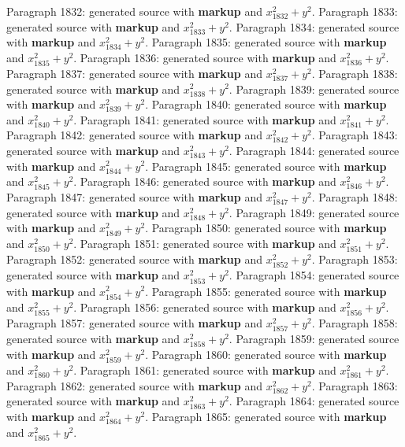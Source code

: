 \documentclass{article}
\begin{document}
Paragraph 1832: generated source with \textbf{markup} and $x_{1832}^2 + y^2$.
Paragraph 1833: generated source with \textbf{markup} and $x_{1833}^2 + y^2$.
Paragraph 1834: generated source with \textbf{markup} and $x_{1834}^2 + y^2$.
Paragraph 1835: generated source with \textbf{markup} and $x_{1835}^2 + y^2$.
Paragraph 1836: generated source with \textbf{markup} and $x_{1836}^2 + y^2$.
Paragraph 1837: generated source with \textbf{markup} and $x_{1837}^2 + y^2$.
Paragraph 1838: generated source with \textbf{markup} and $x_{1838}^2 + y^2$.
Paragraph 1839: generated source with \textbf{markup} and $x_{1839}^2 + y^2$.
Paragraph 1840: generated source with \textbf{markup} and $x_{1840}^2 + y^2$.
Paragraph 1841: generated source with \textbf{markup} and $x_{1841}^2 + y^2$.
Paragraph 1842: generated source with \textbf{markup} and $x_{1842}^2 + y^2$.
Paragraph 1843: generated source with \textbf{markup} and $x_{1843}^2 + y^2$.
Paragraph 1844: generated source with \textbf{markup} and $x_{1844}^2 + y^2$.
Paragraph 1845: generated source with \textbf{markup} and $x_{1845}^2 + y^2$.
Paragraph 1846: generated source with \textbf{markup} and $x_{1846}^2 + y^2$.
Paragraph 1847: generated source with \textbf{markup} and $x_{1847}^2 + y^2$.
Paragraph 1848: generated source with \textbf{markup} and $x_{1848}^2 + y^2$.
Paragraph 1849: generated source with \textbf{markup} and $x_{1849}^2 + y^2$.
Paragraph 1850: generated source with \textbf{markup} and $x_{1850}^2 + y^2$.
Paragraph 1851: generated source with \textbf{markup} and $x_{1851}^2 + y^2$.
Paragraph 1852: generated source with \textbf{markup} and $x_{1852}^2 + y^2$.
Paragraph 1853: generated source with \textbf{markup} and $x_{1853}^2 + y^2$.
Paragraph 1854: generated source with \textbf{markup} and $x_{1854}^2 + y^2$.
Paragraph 1855: generated source with \textbf{markup} and $x_{1855}^2 + y^2$.
Paragraph 1856: generated source with \textbf{markup} and $x_{1856}^2 + y^2$.
Paragraph 1857: generated source with \textbf{markup} and $x_{1857}^2 + y^2$.
Paragraph 1858: generated source with \textbf{markup} and $x_{1858}^2 + y^2$.
Paragraph 1859: generated source with \textbf{markup} and $x_{1859}^2 + y^2$.
Paragraph 1860: generated source with \textbf{markup} and $x_{1860}^2 + y^2$.
Paragraph 1861: generated source with \textbf{markup} and $x_{1861}^2 + y^2$.
Paragraph 1862: generated source with \textbf{markup} and $x_{1862}^2 + y^2$.
Paragraph 1863: generated source with \textbf{markup} and $x_{1863}^2 + y^2$.
Paragraph 1864: generated source with \textbf{markup} and $x_{1864}^2 + y^2$.
Paragraph 1865: generated source with \textbf{markup} and $x_{1865}^2 + y^2$.
\end{document}
